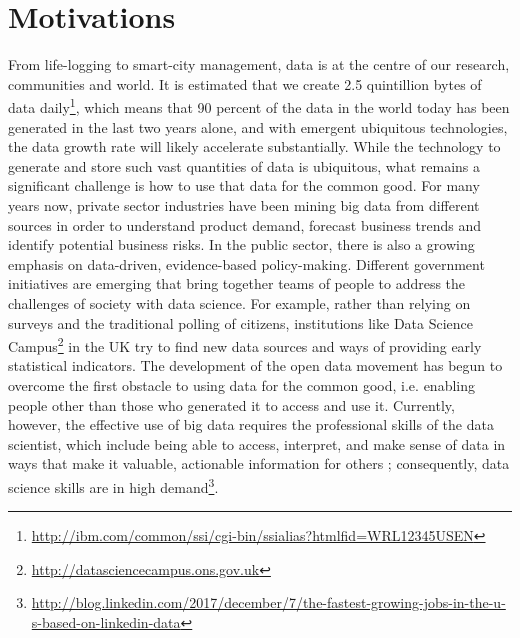 \section{Motivations}
From life-logging to smart-city management, data is at the centre of our research, communities and world. It is estimated that we create 2.5 quintillion bytes of data daily\footnote{\url{http://ibm.com/common/ssi/cgi-bin/ssialias?htmlfid=WRL12345USEN}}, which means that 90 percent of the data in the world today has been generated in the last two years alone, and with emergent ubiquitous technologies, the data growth rate will likely accelerate substantially. While the technology to generate and store such vast quantities of data is ubiquitous, what remains a significant challenge is how to use that data for the common good. For many years now, private sector industries have been mining big data from different sources in order to understand product demand, forecast business trends and identify potential business risks. In the public sector, there is also a growing emphasis on data-driven, evidence-based policy-making. Different government initiatives are emerging that bring together teams of people to address the challenges of society with data science. For example, rather than relying on surveys and the traditional polling of citizens, institutions like Data Science Campus\footnote{\url{http://datasciencecampus.ons.gov.uk}} in the UK try to find new data sources and ways of providing early statistical indicators. The development of the open data movement has begun to overcome the first obstacle to using data for the common good, i.e. enabling people other than those who generated it to access and use it. Currently, however, the effective use of big data \citep{gurstein_open_2011} requires the professional skills of the data scientist, which include being able to access, interpret, and make sense of data in ways that make it valuable, actionable information for others \citep{gitelman_raw_2013}; consequently, data science skills are in high demand\footnote{\url{http://blog.linkedin.com/2017/december/7/the-fastest-growing-jobs-in-the-u-s-based-on-linkedin-data}}.

